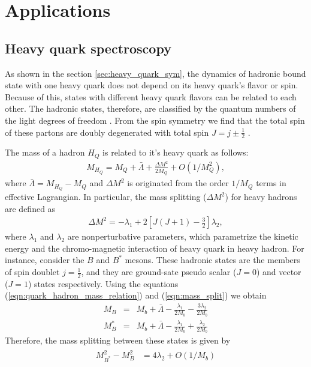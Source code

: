 \section{Applications}
\subsection{Heavy quark spectroscopy}
As shown in the section \ref{sec:heavy_quark_sym}, the dynamics of hadronic bound state with one heavy quark does not depend on its heavy quark's flavor or spin. Because of this, states with different heavy quark flavors can be related to each other. The hadronic states, therefore, are classified by  the quantum numbers of the light degrees of freedom \cite{Falk:1991nq}. From the spin symmetry we find that the total spin of these partons are doubly degenerated with total spin $J=j \pm \frac{1}{2}$ \cite{Isgur:1991wq}.\par
The mass of a hadron $H_Q$ is related to it's heavy quark as follows:
\begin{eqnarray}\label{eqn:quark_hadron_mass_relation}
M_{H_{Q}}=M_{Q}+\bar{\Lambda}+\frac{\Delta M^{2}}{2 M_{Q}}+O\left(1 / M_{Q}^{2}\right), 
\end{eqnarray}
where $\bar{\Lambda}= M_{H_Q}-M_Q$ and $\Delta M^2$ is originated from the order $1/M_Q$ terms in effective Lagrangian. In particular, the mass splitting ($\Delta M^2$) for heavy hadrons are defined as
\begin{eqnarray}\label{eqn:mass_split}
\Delta M^{2}=-\lambda_{1}+2\left[J(J+1)-\frac{3}{2}\right] \lambda_{2},
\end{eqnarray} 
where $\lambda_1$ and $\lambda_2$ are nonperturbative parameters, which parametrize the kinetic energy and the chromo-magnetic interaction of heavy quark in heavy hadron. For instance, consider the $B$ and $B^*$ mesons. These hadronic states are the members of spin doublet $j=\frac{1}{2}$, and they are ground-sate pseudo scalar ($J=0$) and vector ($J=1$) states respectively. Using the equations (\ref{eqn:quark_hadron_mass_relation}) and (\ref{eqn:mass_split}) we obtain
\begin{eqnarray}
M_B&=& M_b+\bar{\Lambda}-\frac{\lambda_1}{2M_b}-\frac{3\lambda_2}{2M_b}\nonumber\\
M_B^*&=& M_b+\bar{\Lambda}-\frac{\lambda_1}{2M_b}+\frac{\lambda_2}{2M_b}
\end{eqnarray}
 Therefore, the mass splitting between these states is given by
\begin{eqnarray}\label{eqn:mass_split_expression}
\begin{aligned} M_{B^{*}}^{2}-M_{B}^{2} &=4 \lambda_{2}+O\left(1 / M_{b}\right) \end{aligned}
\end{eqnarray} 

